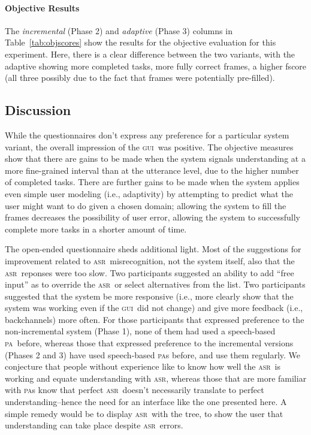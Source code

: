 \documentclass[11pt]{article}
\newcommand{\asr}[0]{\textsc{asr}}
\newcommand{\ui}[0]{\textsc{gui}}
\newcommand{\pa}[0]{\textsc{pa}}
\begin{document}
\paragraph{Objective Results} The \emph{incremental} (Phase 2) and \emph{adaptive} (Phase 3) columns in Table~\ref{tab:objscores} show the results for the objective evaluation for this experiment. Here, there is a clear difference between the two variants, with the adaptive showing more completed tasks, more fully correct frames, a higher fscore (all three possibly due to the fact that frames were potentially pre-filled). 

\subsection{Discussion}

While the questionnaires don't express any preference for a particular system variant, the overall impression of the \ui\ was positive. The objective measures show that there are gains to be made when the system signals understanding at a more fine-grained interval than at the utterance level, due to the higher number of completed tasks. There are further gains to be made when the system applies even simple user modeling (i.e., adaptivity) by attempting to predict what the user might want to do given a chosen domain; allowing the system to fill the frames decreases the possibility of user error, allowing the system to successfully complete more tasks in a shorter amount of time. 

The open-ended questionnaire sheds additional light. Most of the suggestions for improvement related to \asr\ misrecognition, not the system itself, also that the \asr\ reponses were too slow. Two participants suggested an ability to add ``free input'' as to override the \asr\ or select alternatives from the list. Two participants suggested that the system be more responsive (i.e., more clearly show that the system was working even if the \ui\ did not change) and give more feedback (i.e., backchannels) more often. For those participants that expressed preference to the non-incremental system (Phase 1), none of them had used a speech-based \pa\ before, whereas those that expressed preference to the incremental versions (Phases 2 and 3) have used speech-based \pa s before, and use them regularly. We conjecture that people without experience like to know how well the \asr\ is working and equate understanding with \asr, whereas those that are more familiar with \pa s know that perfect \asr\ doesn't necessarily translate to perfect understanding--hence the need for an interface like the one presented here. A simple remedy would be to display \asr\ with the tree, to show the user that understanding can take place despite \asr\ errors.
\end{document}
